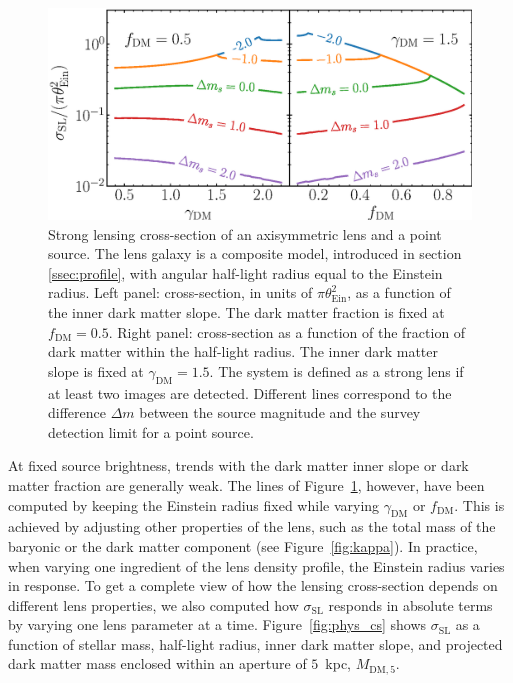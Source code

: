 \documentclass{aa}
\def\reff{R_{\mathrm{e}}}
\def\mstar{M_*}
\def\gammadm{\gamma_{\mathrm{DM}}}
\def\fdm{f_{\mathrm{DM}}}
\def\mdmfive{M_{\mathrm{DM}, 5}}
\def\tein{\theta_{\mathrm{Ein}}}
\def\crosssect{\sigma_\mathrm{{SL}}}
\def\Fref#1{Figure~\ref{#1}\xspace}
\begin{document}
\begin{figure}
\includegraphics[width=\columnwidth]{axisymm_composite_crosssect.eps}
\caption{
Strong lensing cross-section of an axisymmetric lens and a point source.
The lens galaxy is a composite model, introduced in section \ref{ssec:profile}, with angular half-light radius equal to the Einstein radius.
Left panel: cross-section, in units of $\pi\tein^2$, as a function of the inner dark matter slope. The dark matter fraction is fixed at $\fdm=0.5$.
Right panel: cross-section as a function of the fraction of dark matter within the half-light radius. The inner dark matter slope is fixed at $\gammadm=1.5$.
The system is defined as a strong lens if at least two images are detected.
Different lines correspond to the difference $\Delta m$ between the source magnitude and the survey detection limit for a point source.
\label{fig:fixedap_cs}
}
\end{figure}

At fixed source brightness, trends with the dark matter inner slope or dark matter fraction are generally weak.
The lines of \Fref{fig:fixedap_cs}, however, have been computed by keeping the Einstein radius fixed while varying $\gammadm$ or $\fdm$.
This is achieved by adjusting other properties of the lens, such as the total mass of the baryonic or the dark matter component (see \Fref{fig:kappa}). 
In practice, when varying one ingredient of the lens density profile, the Einstein radius varies in response.
To get a complete view of how the lensing cross-section depends on different lens properties, we also computed how $\crosssect$ responds in absolute terms by varying one lens parameter at a time.
\Fref{fig:phys_cs} shows $\crosssect$ as a function of stellar mass, half-light radius, inner dark matter slope, and projected dark matter mass enclosed within an aperture of $5$~kpc, $\mdmfive$.
\end{document}
